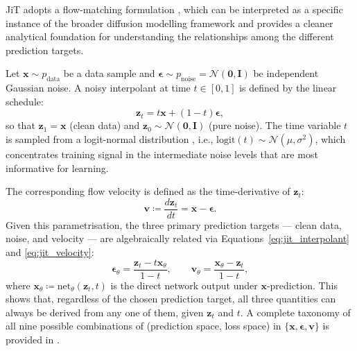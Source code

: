JiT adopts a flow-matching formulation \cite{lipman2022flow, liu2022flow, albergo2023building}, which can be interpreted as a specific instance of the broader diffusion modelling framework and provides a cleaner analytical foundation for understanding the relationships among the different prediction targets.

Let $\bm{x} \sim p_{\mathrm{data}}$ be a data sample and $\bm{\epsilon} \sim p_{\mathrm{noise}} = \mathcal{N}(\bm{0}, \bm{I})$ be independent Gaussian noise. A noisy interpolant at time $t \in [0, 1]$ is defined by the linear schedule:
\begin{equation}
    \bm{z}_t = t\bm{x} + (1-t)\bm{\epsilon},
    \label{eq:jit_interpolant}
\end{equation}
so that $\bm{z}_1 = \bm{x}$ (clean data) and $\bm{z}_0 \sim \mathcal{N}(\bm{0}, \bm{I})$ (pure noise). The time variable $t$ is sampled from a logit-normal distribution \cite{esser2024sd3}, i.e., $\mathrm{logit}(t) \sim \mathcal{N}(\mu, \sigma^2)$, which concentrates training signal in the intermediate noise levels that are most informative for learning.

The corresponding flow velocity is defined as the time-derivative of $\bm{z}_t$:
\begin{equation}
    \bm{v} \coloneqq \frac{d\bm{z}_t}{dt} = \bm{x} - \bm{\epsilon}.
    \label{eq:jit_velocity}
\end{equation}
Given this parametrisation, the three primary prediction targets — clean data, noise, and velocity — are algebraically related via Equations~\ref{eq:jit_interpolant} and \ref{eq:jit_velocity}:
\begin{equation}
    \bm{\epsilon}_\theta = \frac{\bm{z}_t - t\bm{x}_\theta}{1-t}, \qquad \bm{v}_\theta = \frac{\bm{x}_\theta - \bm{z}_t}{1-t},
    \label{eq:jit_derived}
\end{equation}
where $\bm{x}_\theta \coloneqq \mathrm{net}_\theta(\bm{z}_t, t)$ is the direct network output under $\bm{x}$-prediction. This shows that, regardless of the chosen prediction target, all three quantities can always be derived from any one of them, given $\bm{z}_t$ and $t$. A complete taxonomy of all nine possible combinations of (prediction space, loss space) in $\{\bm{x}, \bm{\epsilon}, \bm{v}\}$ is provided in \cite{li2025jit}.

